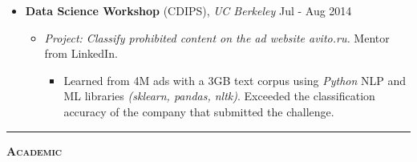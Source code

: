 \documentclass[10pt,letterpaper]{article}
\begin{document}
\begin{minipage}{0.95\textwidth}
\begin{itemize}
\begin{itemize}
        \end{itemize}
        \item \textbf{Data Science Workshop} (CDIPS), \emph{UC Berkeley} \hfill{Jul - Aug 2014}
            \begin{itemize}
                \item \emph{Project: Classify prohibited content on the ad website avito.ru.} Mentor from LinkedIn.
                \begin{itemize}
                    \item Learned from 4M ads with a 3GB text corpus using \emph{Python} NLP and ML libraries \emph{(sklearn, pandas, nltk)}.
                        Exceeded the classification accuracy of the company that submitted the challenge.
                \end{itemize}
            \end{itemize}
    \end{itemize}
    \par\nopagebreak\medskip\hrule\medskip
\end{minipage}
\begin{minipage}{0.05\textwidth}
    \begin{sideways}{\bf\textsc{Academic}}\end{sideways}
\end{minipage}
\end{document}

